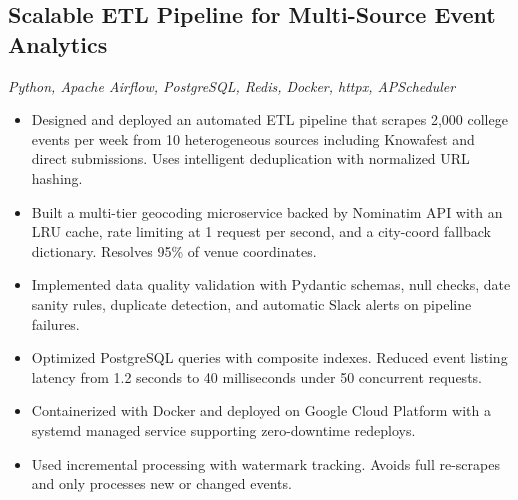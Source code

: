 \documentclass[10pt]{article}
\begin{document}
\subsection{Scalable ETL Pipeline for Multi-Source Event Analytics}
\textit{Python, Apache Airflow, PostgreSQL, Redis, Docker, httpx, APScheduler}
\begin{itemize}
  \item Designed and deployed an automated ETL pipeline that scrapes 2,000 college events per week from 10 heterogeneous sources including Knowafest and direct submissions. Uses intelligent deduplication with normalized URL hashing.
  \item Built a multi-tier geocoding microservice backed by Nominatim API with an LRU cache, rate limiting at 1 request per second, and a city-coord fallback dictionary. Resolves 95\% of venue coordinates.
  \item Implemented data quality validation with Pydantic schemas, null checks, date sanity rules, duplicate detection, and automatic Slack alerts on pipeline failures.
  \item Optimized PostgreSQL queries with composite indexes. Reduced event listing latency from 1.2 seconds to 40 milliseconds under 50 concurrent requests.
  \item Containerized with Docker and deployed on Google Cloud Platform with a systemd managed service supporting zero-downtime redeploys.
  \item Used incremental processing with watermark tracking. Avoids full re-scrapes and only processes new or changed events.
\end{itemize}
\end{document}
